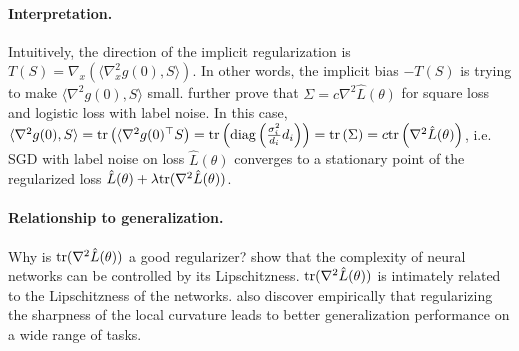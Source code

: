 \paragraph{Interpretation.} Intuitively, the direction of the implicit regularization is $T(S) = \nabla_x \left(\langle\nabla_x^2g(0), S\rangle\right)$. In other words, the implicit bias $-T(S)$ is trying to make $\langle\nabla^2g(0), S\rangle$ small. \cite{damian2021label} further prove that $\Sigma = c\nabla^2\hat{L}(\theta)$ for square loss and logistic loss with label noise. In this case, $\langle\nabla^2g(0), S\rangle = \textup{tr}\left({\langle\nabla^2g(0)^\top S}\right) =  \textup{tr}\left(\text{diag}\left(\frac{\sigma_i^2}{d_i}d_i\right)\right) =  \textup{tr}\left(\Sigma\right) = c \textup{tr}\left(\nabla^2\hat{L}(\theta)\right)$, i.e. SGD with label noise on loss $\hat{L}(\theta)$ converges to a stationary point of the regularized loss $\hat{L}(\theta) + \lambda \textup{tr}(\nabla^2\hat{L}(\theta))$.

\paragraph{Relationship to generalization.} Why is $\textup{tr}(\nabla^2\hat{L}(\theta))$ a good regularizer? \cite{wei2019improved} show that the complexity of neural networks can be controlled by its Lipschitzness. $\textup{tr}(\nabla^2\hat{L}(\theta))$ is intimately related to the Lipschitzness of the networks. \cite{foret2020sharpness} also discover empirically that regularizing the sharpness of the local curvature leads to better generalization performance on a wide range of tasks.